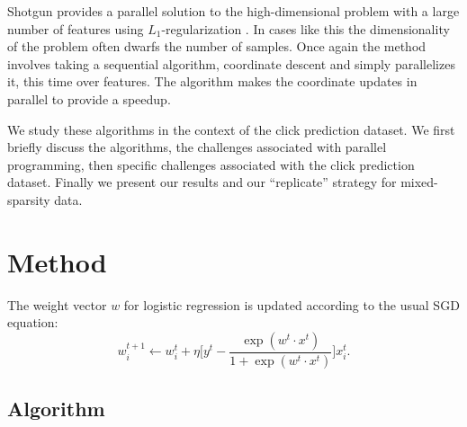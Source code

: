 \documentclass{article} %
\begin{document}
Shotgun provides a parallel solution to the high-dimensional problem with a large number of features using $L_1$-regularization \cite{ng2004feature}. In cases like this the dimensionality of the problem often dwarfs the number of samples. Once again the method involves taking a sequential algorithm, coordinate descent and simply parallelizes it, this time over features. The algorithm makes the coordinate updates in parallel to provide a speedup.

We study these algorithms in the context of the click prediction dataset. We first briefly discuss the algorithms, the challenges associated with parallel programming, then specific challenges associated with the click prediction dataset. Finally we present our results and our ``replicate'' strategy for mixed-sparsity data.

\section{Method}
The weight vector $w$ for logistic regression is updated according to the usual SGD equation:
\begin{equation}
w_i^{t+1} \leftarrow w_i^t + \eta \bigg[y^t - \frac{\exp{(w^t \cdot x^t)}}{1 + \exp{(w^t \cdot x^t)}} \bigg]x_i^t.
\end{equation}


\subsection{Algorithm}
\end{document}
